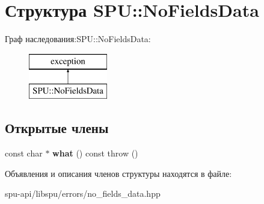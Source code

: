 \hypertarget{struct_s_p_u_1_1_no_fields_data}{}\section{Структура S\+PU\+:\+:No\+Fields\+Data}
\label{struct_s_p_u_1_1_no_fields_data}
Граф наследования\+:S\+PU\+:\+:No\+Fields\+Data\+:\begin{figure}[H]
\begin{center}
\leavevmode
\includegraphics[height=2.000000cm]{struct_s_p_u_1_1_no_fields_data}
\end{center}
\end{figure}
\subsection*{Открытые члены}
\begin{DoxyCompactItemize}
\item 
\mbox{\label{struct_s_p_u_1_1_no_fields_data_a7eee5209ec03f5ba6f69efbf247a25e0}} 
const char $\ast$ {\bfseries what} () const  throw ()
\end{DoxyCompactItemize}


Объявления и описания членов структуры находятся в файле\+:\begin{DoxyCompactItemize}
\item 
spu-\/api/libspu/errors/no\+\_\+fields\+\_\+data.\+hpp\end{DoxyCompactItemize}
